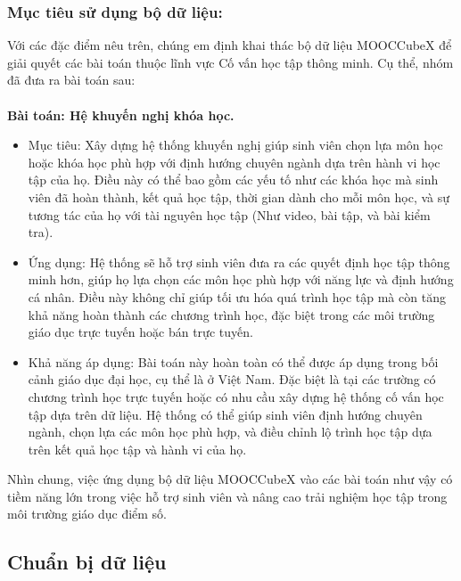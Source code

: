 \subsubsection{Mục tiêu sử dụng bộ dữ liệu:}
Với các đặc điểm nêu trên, chúng em định khai thác bộ dữ liệu MOOCCubeX để giải quyết các bài toán thuộc lĩnh vực Cố vấn học tập thông minh. Cụ thể, nhóm đã đưa ra bài toán sau:\\
\\
\textbf{Bài toán: Hệ khuyến nghị khóa học.}
\begin{itemize}
    \item Mục tiêu: Xây dựng hệ thống khuyến nghị giúp sinh viên chọn lựa môn học hoặc khóa học phù hợp với định hướng chuyên ngành dựa trên hành vi học tập của họ. Điều này có thể bao gồm các yếu tố như các khóa học mà sinh viên đã hoàn thành, kết quả học tập, thời gian dành cho mỗi môn học, và sự tương tác của họ với tài nguyên học tập (Như video, bài tập, và bài kiểm tra).
    \item Ứng dụng: Hệ thống sẽ hỗ trợ sinh viên đưa ra các quyết định học tập thông minh hơn, giúp họ lựa chọn các môn học phù hợp với năng lực và định hướng cá nhân. Điều này không chỉ giúp tối ưu hóa quá trình học tập mà còn tăng khả năng hoàn thành các chương trình học, đặc biệt trong các môi trường giáo dục trực tuyến hoặc bán trực tuyến.
    \item Khả năng áp dụng: Bài toán này hoàn toàn có thể được áp dụng trong bối cảnh giáo dục đại học, cụ thể là ở Việt Nam. Đặc biệt là tại các trường có chương trình học trực tuyến hoặc có nhu cầu xây dựng hệ thống cố vấn học tập dựa trên dữ liệu. Hệ thống có thể giúp sinh viên định hướng chuyên ngành, chọn lựa các môn học phù hợp, và điều chỉnh lộ trình học tập dựa trên kết quả học tập và hành vi của họ.
\end{itemize}
Nhìn chung, việc ứng dụng bộ dữ liệu MOOCCubeX vào các bài toán như vậy có tiềm năng lớn trong việc hỗ trợ sinh viên và nâng cao trải nghiệm học tập trong môi trường giáo dục điểm số.
\newpage
\subsection{Chuẩn bị dữ liệu}
